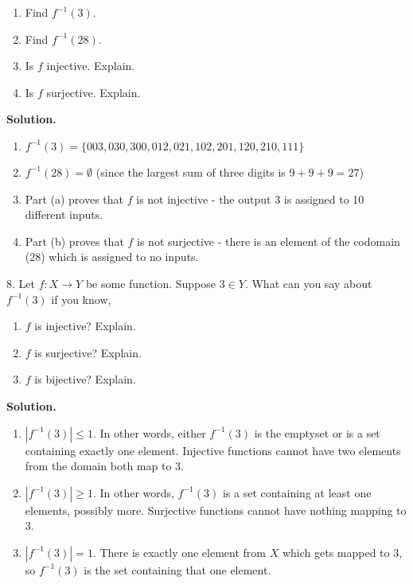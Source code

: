 \documentclass[10pt,]{book}
\theoremstyle{plain}
\theoremstyle{definition}
\theoremstyle{definition}
\theoremstyle{definition}
\def\inv{^{-1}}
\begin{document}
\begin{exerciselist}
\begin{enumerate}[label=(\alph*)]
\item\hypertarget{li-325}{}
                Find \(f\inv(3)\).
\item\hypertarget{li-326}{}
                Find \(f\inv(28)\).
\item\hypertarget{li-327}{}
                Is \(f\) injective. Explain.
\item\hypertarget{li-328}{}
                Is \(f\) surjective. Explain.
\end{enumerate}
\par\smallskip
\par\smallskip
\noindent\textbf{Solution.}\hypertarget{solution-51}{}\quad
\leavevmode%
\begin{enumerate}[label=(\alph*)]
\item\hypertarget{li-329}{}\(f\inv(3) = \{003, 030, 300, 012, 021, 102, 201, 120, 210, 111\}\)\item\hypertarget{li-330}{}\(f\inv(28) = \emptyset\) (since the largest sum of three digits is \(9+9+9 = 27\))\item\hypertarget{li-331}{}
                Part (a) proves that \(f\) is not injective - the output 3 is assigned to 10 different inputs.
\item\hypertarget{li-332}{}
                Part (b) proves that \(f\) is not surjective - there is an element of the codomain (28) which is assigned to no inputs.
\end{enumerate}
\item[8.]\hypertarget{exercise-34}{}
            Let \(f:X \to Y\) be some function. Suppose \(3 \in Y\). What can you say about \(f\inv(3)\) if you know,
\leavevmode%
\begin{enumerate}[label=(\alph*)]
\item\hypertarget{li-333}{}\(f\) is injective? Explain.\item\hypertarget{li-334}{}\(f\) is surjective? Explain.\item\hypertarget{li-335}{}\(f\) is bijective? Explain.\end{enumerate}
\par\smallskip
\par\smallskip
\noindent\textbf{Solution.}\hypertarget{solution-52}{}\quad
\leavevmode%
\begin{enumerate}[label=(\alph*)]
\item\hypertarget{li-336}{}\(|f\inv(3)| \le 1\). In other words, either \(f\inv(3)\) is the emptyset or is a set containing exactly one element. Injective functions cannot have two elements from the domain both map to 3.\item\hypertarget{li-337}{}\(|f\inv(3)| \ge 1\). In other words, \(f\inv(3)\) is a set containing at least one elements, possibly more. Surjective functions cannot have nothing mapping to 3.\item\hypertarget{li-338}{}\(|f\inv(3)| = 1\). There is exactly one element from \(X\) which gets mapped to 3, so \(f\inv(3)\) is the set containing that one element.\end{enumerate}

\end{exerciselist}
\end{document}

